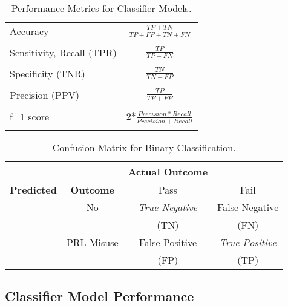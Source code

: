 
\begin{table}
  \caption{Performance Metrics for Classifier Models.}
  \label{tab:freq}
  \begin{tabular}{lc}
    \toprule
    Accuracy & \(\frac{TP+TN}{TP+FP+TN+FN}\) \\
    & \\
    Sensitivity, Recall (TPR) &  \(\frac{TP}{TP+FN}\) \\
    & \\
    Specificity (TNR) &  \(\frac{TN}{TN+FP}\) \\
    & \\
    Precision (PPV) & \(\frac{TP}{TP+FP}\)  \\
    & \\
    f_1 score & 2*\(\frac{Precision*Recall}{Precision+Recall}\) \\
    & \\
    \bottomrule
  \end{tabular}
\end{table}




\begin{table}
  \caption{Confusion Matrix for Binary Classification.}
  \label{tab:freq}
  \begin{tabular}{cccc}
    \toprule
     & &  \textbf{Actual Outcome} & \\
    \midrule
    \textbf{Predicted} & \textbf{Outcome} & Pass & Fail \\
    \midrule
    & No & \textit{True Negative} & False Negative \\
    & & (TN) & (FN) \\
    \midrule
    & PRL Misuse & False Positive & \textit{True Positive} \\
    & & (FP) & (TP)  \\
    \bottomrule
  \end{tabular}
\end{table}


\subsection{Classifier Model Performance}

